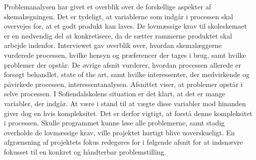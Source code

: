 Problemanalysen har givet et overblik over de forskellige aspekter af skemalægningen. Det er tydeligt, at variablerne som indgår i processen skal overvejes for, at et godt produkt kan laves. De lovmæssige krav til skoleskemaet er en nødvendig del at konkretisere, da de sætter rammerne produktet skal arbejde indenfor. Interviewet gav overblik over, hvordan skemalæggerne vurderede processen, hvilke hensyn og præferencer der tages i brug, samt hvilke problemer der opstår. De øvrige afsnit vurderer, hvordan processen allerede er forsøgt behandlet, state of the art, samt hvilke interessenter, der medvirkende og påvirkede processen, interessentanalysen. 
Afsnittet viser, at problemer opstår i selve processen. I Sofiendalskolens situation er det klart, at det er mange variabler, der indgår. At være i stand til at vægte disse variabler mod hinanden giver dog en hvis kompleksitet. Det er derfor vigtigt, at forstå denne kompleksitet i processen. Skulle programmet kunne løse alle problemerne, samt stadig overholde de lovmæssige krav, ville projektet hurtigt blive uoverskueligt. En afgrænsning af projektets fokus redegøres for i følgende afsnit for at indsnævre fokusset til en konkret og håndterbar problemstilling.
